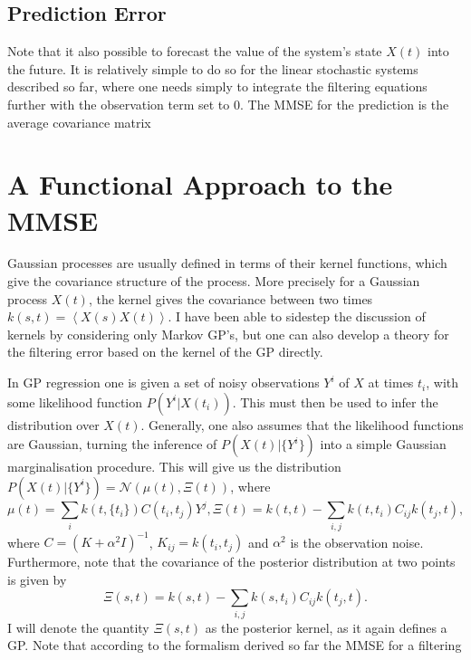 \subsection{Prediction Error}

Note that it also possible to forecast the value of the system's state $X(t)$ into the future. It is relatively simple to do so for the linear stochastic systems described
so far, where one needs simply to integrate the filtering equations further with the observation term set to 0. The MMSE for the prediction is the average covariance
matrix 

\section{A Functional Approach to the MMSE}

Gaussian processes are usually defined in terms of their kernel functions, which give the covariance structure of the process. More precisely for a Gaussian process 
$X(t)$, the kernel gives the covariance between two times $k(s,t) = \left<X(s)X(t)\right>$. I have been able to sidestep the discussion of kernels by considering only
Markov GP's, but one can also develop a theory for the filtering error based on the kernel of the GP directly.\par
In GP regression one is given a set of noisy observations $Y^i$ of $X$ at times $t_i$, with some likelihood function
$P(Y^i|X(t_i))$. This must then be used to infer the distribution over $X(t)$. Generally, one also assumes that the likelihood functions are Gaussian, turning the
inference of $P(X(t)|\{Y^i\})$ into a simple Gaussian marginalisation procedure. This will give us the distribution $P(X(t) | \{Y^i\}) = \mathcal{N}(\mu(t), \Xi(t))$, where
\begin{subequations}
\begin{equation}
\mu(t) = \sum_i k(t,\{t_i\}) C(t_i,t_j) Y^j,
\end{equation}
\begin{equation}
\Xi(t) = k(t,t) - \sum_{i,j}k(t,t_i) C_{ij} k(t_j,t),
\end{equation}
\end{subequations}
where $C = (K+\alpha^2 I)^{-1}$, $K_{ij} = k(t_i,t_j)$ and $\alpha^2$ is the observation noise. Furthermore, note that the covariance of the posterior distribution at two
points is given by
\[
\Xi(s,t) = k(s,t) - \sum_{i,j} k(s,t_i) C_{ij} k(t_j,t).
\]
I will denote the quantity $\Xi(s,t)$ as the posterior kernel, as it again defines a GP. Note that according to the formalism derived so far the MMSE for a filtering 
